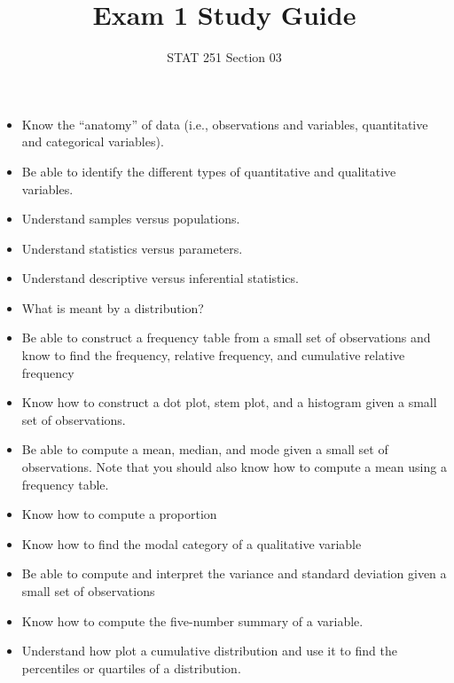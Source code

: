 \documentclass[18pt]{article}
\begin{document}
	\title{Exam 1 Study Guide \\}
	\author{ STAT 251 Section 03 }
	\maketitle
	
	\begin{itemize}
		\item Know the “anatomy” of data (i.e., observations and variables, quantitative and categorical variables).
		
		\item Be able to identify the different types of quantitative and qualitative variables. 
		
		\item Understand samples versus populations.
		
		\item Understand statistics versus parameters.
		
		\item Understand descriptive versus inferential statistics.
		
		\item What is meant by a distribution?
		
		\item Be able to construct a frequency table from a small set of observations and know to find the frequency, relative frequency, and cumulative relative frequency 
		
		\item Know how to construct a dot plot, stem plot, and a histogram given a small set of observations.
		
		\item Be able to compute a mean, median, and mode given a small set of observations. Note that you should also know how to compute a mean using a frequency table.
		
		\item Know how to compute a proportion
		
		\item Know how to find the modal category of a qualitative variable
		
		\item Be able to compute and interpret the variance and standard deviation given a small set of observations
		
		\item Know how to compute the five-number summary of a variable.
		
		\item Understand how plot a cumulative distribution and use it to find the percentiles or quartiles of a distribution. 
		

\end{itemize}
\end{document}
